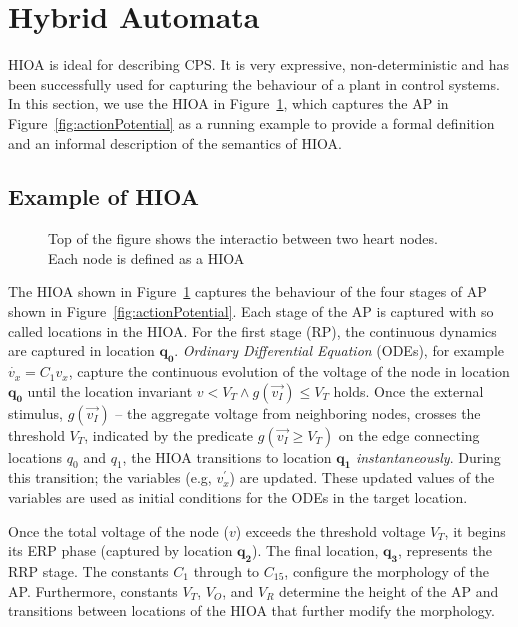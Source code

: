 \section{Hybrid Automata}
\label{sec:HA}


\acf{HIOA} is ideal for describing \ac{CPS}. It is very expressive,
non-deterministic and has been successfully used for capturing the
behaviour of a plant in control systems.  In this section, we use the
\ac{HIOA} in Figure~\ref{fig:heartCellHA}, which captures the \ac{AP} in
Figure~\ref{fig:actionPotential} as a running example to provide a
formal definition and an informal description of the semantics of
\ac{HIOA}.



\subsection{Example of \acf{HIOA} }

\begin{figure}
  \centering
  
  \caption{Top of the figure shows the interactio between two heart nodes. Each node is defined as a \acf{HIOA} \label{fig:heartCellHA}}
\end{figure}

The \ac{HIOA} shown in Figure~\ref{fig:heartCellHA} captures the
behaviour of the four stages of \ac{AP} shown in
Figure~\ref{fig:actionPotential}. Each stage of the \ac{AP} is captured
with so called locations in the \ac{HIOA}. For the first stage
(\ac{RP}), the continuous dynamics are captured in location
$\mathbf{q_0}$. \textit{Ordinary Differential Equation} (ODEs), for
example \mbox{$\dot{v_{x}} = C_{1}v_{x}$}, capture the continuous
evolution of the voltage of the node in location $\mathbf{q_{0}}$ until
the location invariant $v < V_{T} \wedge g(\vec{v_{I}}) \leq V_{T}$
holds. Once the external stimulus, $g(\vec{v_{I}})$ -- the aggregate
voltage from neighboring nodes, crosses the threshold $V_{T}$, indicated
by the predicate \mbox{$g(\vec{v_{I}} \geq V_{T})$} on the edge
connecting locations $q_{0}$ and $q_{1}$, the \ac{HIOA} transitions to
location $\mathbf{q_{1}}$ \textit{instantaneously}. During this
transition; the variables (e.g, $v^{\prime}_{x}$) are updated. These
updated values of the variables are used as initial conditions for the
ODEs in the target location.

Once the total voltage of the node ($v$) exceeds the threshold voltage
$V_{T}$, it begins its \ac{ERP} phase (captured by location
$\mathbf{q_2}$). The final location, $\mathbf{q_3}$, represents the
\ac{RRP} stage.  The constants $C_1$ through to $C_{15}$, configure the
morphology of the \ac{AP}. Furthermore, constants $V_T$, $V_O$, and
$V_R$ determine the height of the \ac{AP} and transitions between
locations of the \ac{HIOA} that further modify the morphology.

